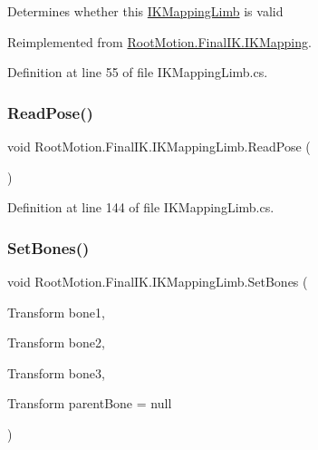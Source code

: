Determines whether this \mbox{\hyperlink{class_root_motion_1_1_final_i_k_1_1_i_k_mapping_limb}{I\+K\+Mapping\+Limb}} is valid 



Reimplemented from \mbox{\hyperlink{class_root_motion_1_1_final_i_k_1_1_i_k_mapping_a4a81f9083afd318e2578de48fa914870}{Root\+Motion.\+Final\+I\+K.\+I\+K\+Mapping}}.



Definition at line 55 of file I\+K\+Mapping\+Limb.\+cs.

\mbox{\label{class_root_motion_1_1_final_i_k_1_1_i_k_mapping_limb_a245c8e88e172a550589568139339eaec}} 
\subsubsection{\texorpdfstring{Read\+Pose()}{ReadPose()}}
{\footnotesize\ttfamily void Root\+Motion.\+Final\+I\+K.\+I\+K\+Mapping\+Limb.\+Read\+Pose (\begin{DoxyParamCaption}{ }\end{DoxyParamCaption})}



Definition at line 144 of file I\+K\+Mapping\+Limb.\+cs.

\mbox{\label{class_root_motion_1_1_final_i_k_1_1_i_k_mapping_limb_aec81c5311241a3c333ca440b19fa8a0f}} 
\subsubsection{\texorpdfstring{Set\+Bones()}{SetBones()}}
{\footnotesize\ttfamily void Root\+Motion.\+Final\+I\+K.\+I\+K\+Mapping\+Limb.\+Set\+Bones (\begin{DoxyParamCaption}\item[{Transform}]{bone1,  }\item[{Transform}]{bone2,  }\item[{Transform}]{bone3,  }\item[{Transform}]{parent\+Bone = {\ttfamily null} }\end{DoxyParamCaption})}



